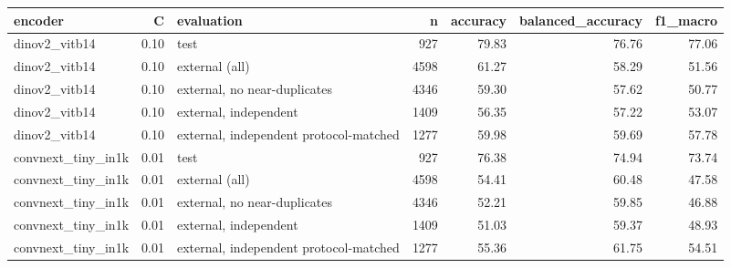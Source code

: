 \begin{tabular}{lrlrrrr}
\toprule
encoder & C & evaluation & n & accuracy & balanced\_accuracy & f1\_macro \\
\midrule
dinov2\_vitb14 & 0.10 & test & 927 & 79.83 & 76.76 & 77.06 \\
dinov2\_vitb14 & 0.10 & external (all) & 4598 & 61.27 & 58.29 & 51.56 \\
dinov2\_vitb14 & 0.10 & external, no near-duplicates & 4346 & 59.30 & 57.62 & 50.77 \\
dinov2\_vitb14 & 0.10 & external, independent & 1409 & 56.35 & 57.22 & 53.07 \\
dinov2\_vitb14 & 0.10 & external, independent protocol-matched & 1277 & 59.98 & 59.69 & 57.78 \\
convnext\_tiny\_in1k & 0.01 & test & 927 & 76.38 & 74.94 & 73.74 \\
convnext\_tiny\_in1k & 0.01 & external (all) & 4598 & 54.41 & 60.48 & 47.58 \\
convnext\_tiny\_in1k & 0.01 & external, no near-duplicates & 4346 & 52.21 & 59.85 & 46.88 \\
convnext\_tiny\_in1k & 0.01 & external, independent & 1409 & 51.03 & 59.37 & 48.93 \\
convnext\_tiny\_in1k & 0.01 & external, independent protocol-matched & 1277 & 55.36 & 61.75 & 54.51 \\
\bottomrule
\end{tabular}
